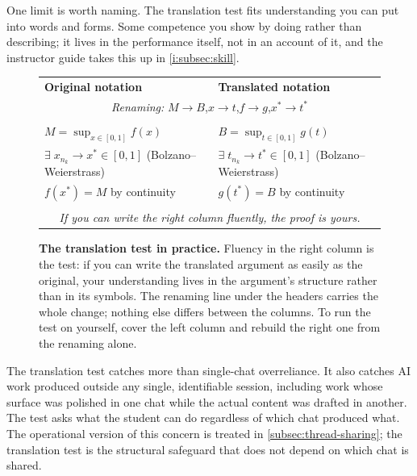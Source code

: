 \documentclass{SIAMbook2023}
\begin{document}
One limit is worth naming. The translation test fits understanding you can put into words and forms. Some competence you show by doing rather than describing; it lives in the performance itself, not in an account of it, and the instructor guide takes this up in \cref{i:subsec:skill}.
\begin{figure}[ht]
\centering
\small
\begin{tabular}{p{} p{}}
\textbf{\textcolor{guideblue}{Original notation}} &
\textbf{\textcolor{guideblue}{Translated notation}} \\[0.2em]
\multicolumn{2}{c}{\footnotesize\textit{Renaming:}\; $M \to B$,\quad $x \to t$,\quad $f \to g$,\quad $x^* \to t^*$} \\[0.4em]
\hline \\[-0.5em]
$M = \sup_{x \in [0,1]} f(x)$ & $B = \sup_{t \in [0,1]} g(t)$ \\[0.5em]
$\exists\;x_{n_k} \to x^* \in [0,1]$ (Bolzano--Weierstrass) & $\exists\;t_{n_k} \to t^* \in [0,1]$ (Bolzano--Weierstrass) \\[0.5em]
$f(x^*) = M$ by continuity & $g(t^*) = B$ by continuity \\[0.3em]
\hline \\[-0.3em]
\multicolumn{2}{c}{\normalfont\textit{If you can write the right column fluently, the proof is yours.}}
\end{tabular}
\caption{\textbf{The translation test in practice.} Fluency in the right column is the test: if you can write the translated argument as easily as the original, your understanding lives in the argument's structure rather than in its symbols. The renaming line under the headers carries the whole change; nothing else differs between the columns. To run the test on yourself, cover the left column and rebuild the right one from the renaming alone.}
\label{fig:translation-test}
\end{figure}

The translation test catches more than single-chat overreliance. It also catches AI work produced outside any single, identifiable session, including work whose surface was polished in one chat while the actual content was drafted in another. The test asks what the student can do regardless of which chat produced what. The operational version of this concern is treated in \cref{subsec:thread-sharing}; the translation test is the structural safeguard that does not depend on which chat is shared.
\end{document}
